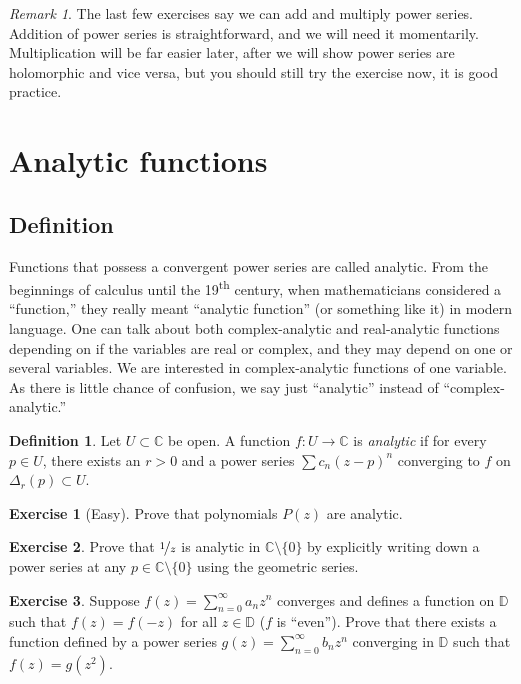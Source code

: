 \documentclass[12pt,openany]{book}
\newcommand{\C}{{\mathbb{C}}}
\newcommand{\D}{{\mathbb{D}}}
\newcommand{\myindex}[1]{#1\index{#1}}
\newcommand{\myquote}[1]{``#1''}
\theoremstyle{plain}
\theoremstyle{remark}
\newtheorem{remark}[thm]{Remark}
\theoremstyle{definition}
\newtheorem{defn}[thm]{Definition}
\newenvironment{exbox}{%
    \def\FrameCommand{\vrule width 1pt \relax\hspace{10pt}}%
    \MakeFramed{\advance\hsize-\width\FrameRestore}%
}{%
    \endMakeFramed
}
\theoremstyle{exercise}
\newtheorem{exercise}{Exercise}[section]
\theoremstyle{example}
\begin{document}
\begin{remark}
The last few exercises say we can add and multiply power series.
Addition of power series is straightforward, and we will need it momentarily.
Multiplication will be far easier later, after
we will show power series are
holomorphic and vice versa, but you should still try the exercise now, it is good
practice.
\end{remark}


\section{Analytic functions}
\label{sec:analfuncs}

\subsection{Definition}

Functions that possess a convergent power series are called analytic.
From the beginnings of calculus until the 19\textsuperscript{th} century, 
when mathematicians considered a \myquote{function,} they really meant
\myquote{analytic function} (or something like it) in modern language.
One can talk about
both complex-analytic and real-analytic functions depending on if the
variables are real or complex, and they may depend on one or several variables.
We are interested in complex-analytic functions of one variable. 
As there is little chance of confusion, we say just \myquote{analytic} instead of
\myquote{complex-analytic.}

\begin{defn}
Let $U \subset \C$ be open.  A function $f \colon U \to \C$
is \emph{\myindex{analytic}}
if for every $p \in U$, there exists 
an $r > 0$ and a
power series $\sum c_n {(z-p)}^n$ converging to $f$ on $\Delta_r(p) \subset
U$.
\end{defn}

\begin{exbox}
\begin{exercise}[Easy]
Prove that polynomials $P(z)$ are analytic.
\end{exercise}

\begin{exercise}
Prove that $\nicefrac{1}{z}$ is analytic in $\C \setminus \{ 0 \}$
by explicitly writing down 
a power series at any $p \in \C \setminus \{ 0 \}$
using the geometric series.
\end{exercise}

\begin{exercise}
Suppose $f(z) = \sum_{n=0}^\infty a_n z^n$ converges and defines a
function on $\D$ such that $f(z) = f(-z)$ for all $z \in \D$ ($f$ is
\myquote{even}).
Prove that there exists a function defined by a power series
$g(z) = \sum_{n=0}^\infty b_n z^n$ converging in $\D$ such that
$f(z) = g(z^2)$.
\end{exercise}
\end{exbox}
\end{document}
